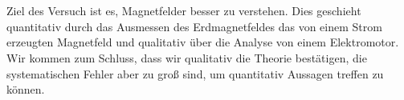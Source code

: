 \section*{\abstractname}
\label{sec:zusammenfassung}


Ziel des Versuch ist es, Magnetfelder besser zu verstehen. Dies geschieht quantitativ durch das Ausmessen des Erdmagnetfeldes das von einem Strom erzeugten Magnetfeld und qualitativ über die Analyse von einem Elektromotor. Wir kommen zum Schluss, dass wir qualitativ die Theorie bestätigen, die systematischen Fehler aber zu groß sind, um quantitativ Aussagen treffen zu können.

\vspace{3cm}
